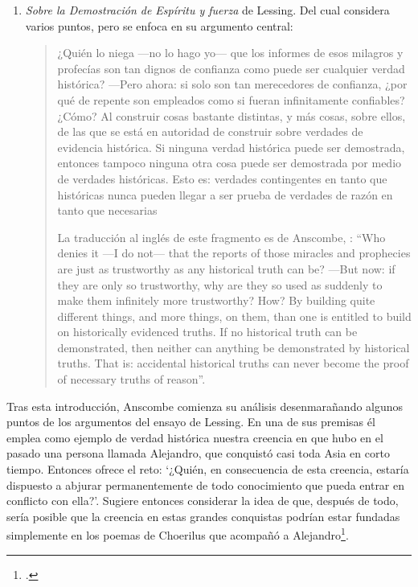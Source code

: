 \begin{enumerate}
\item \emph{Sobre la Demostración de Espíritu y fuerza} de Lessing. Del cual considera varios puntos, pero se enfoca en su argumento central: \blockquote[La traducción al inglés de este fragmento es de Anscombe, {\cite[Cf.][22]{anscombe2008faith:prophandmi}}: \enquote{Who denies it ---I do not--- that the reports of those miracles and prophecies are just as trustworthy as any historical truth can be? ---But now: if they are only so trustworthy, why are they so used as suddenly to make them infinitely more trustworthy? How? By building quite different things, and more things, on them, than one is entitled to build on historically evidenced truths. If no historical truth can be demonstrated, then neither can anything be demonstrated by historical truths. That is: accidental historical truths can never become the proof of necessary truths of reason}.]{¿Quién lo niega ---no lo hago yo--- que los informes de esos milagros y profecías son tan dignos de confianza como puede ser cualquier verdad histórica? ---Pero ahora: si solo son tan merecedores de confianza, ¿por qué de repente son empleados como si fueran infinitamente confiables? ¿Cómo? Al construir cosas bastante distintas, y más cosas, sobre ellos, de las que se está en autoridad de construir sobre verdades de evidencia histórica. Si ninguna verdad histórica puede ser demostrada, entonces tampoco ninguna otra cosa puede ser demostrada por medio de verdades históricas. Esto es: verdades contingentes en tanto que históricas nunca pueden llegar a ser prueba de verdades de razón en tanto que necesarias}.
\end{enumerate}

Tras esta introducción, Anscombe comienza su análisis desenmarañando algunos puntos de los argumentos del ensayo de Lessing. En una de sus premisas él emplea como ejemplo de verdad histórica nuestra creencia en que hubo en el pasado una persona llamada Alejandro, que conquistó casi toda Asia en corto tiempo. Entonces ofrece el reto: \enquote*{¿Quién, en consecuencia de esta creencia, estaría dispuesto a abjurar permanentemente de todo conocimiento que pueda entrar en conflicto con ella?}. Sugiere entonces considerar la idea de que, después de todo, sería posible que la creencia en estas grandes conquistas podrían estar fundadas simplemente en los poemas de Choerilus que acompañó a Alejandro\footnote{\cite[Cf.][448]{lessing1982escritos:demo}.}.

